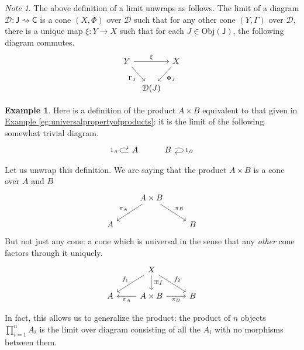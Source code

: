 \documentclass[a4paper]{report}
\newcommand{\Obj}{\mathrm{Obj}}
\theoremstyle{definition}
\newtheorem{example}{Example}[section]
\theoremstyle{plain}
\theoremstyle{remark}
\newtheorem{note}{Note}[section]
\begin{document}
\begin{note}
  The above definition of a limit unwraps as follows. The limit of a diagram $\mathcal{D}\colon \mathsf{J} \rightsquigarrow \mathsf{C}$ is a cone $(X, \Phi)$ over $\mathcal{D}$ such that for any other cone $(Y, \Gamma)$ over $\mathcal{D}$, there is a unique map $\xi\colon Y \to X$ such that for each $J \in \Obj(\mathsf{J})$, the following diagram commutes.
  \begin{equation*}
    \begin{tikzcd}[column sep=tiny]
      Y
      \arrow[rr, "\xi"]
      \arrow[dr, swap, "\Gamma_{J}"]
      & & X
      \arrow[dl, "\Phi_{J}"]
      \\
      & \mathcal{D}(J)
    \end{tikzcd}
  \end{equation*}
\end{note} 

\begin{example}
  Here is a definition of the product $A \times B$ equivalent to that given in \hyperref[eg:universalpropertyofproducts]{Example \ref*{eg:universalpropertyofproducts}}: it is the limit of the following somewhat trivial diagram.
  \begin{equation*}
    \begin{tikzcd}
      A
      \arrow[loop left, "1_{A}"]
      & B
      \arrow[loop right, "1_{B}"]
    \end{tikzcd}
  \end{equation*}

  Let us unwrap this definition. We are saying that the product $A \times B$ is a cone over $A$ and $B$
  \begin{equation*}
    \begin{tikzcd}
      & A \times B
      \arrow[dl, swap, "\pi_{A}"]
      \arrow[dr, "\pi_{B}"]
      \\
      A & & B
    \end{tikzcd}
  \end{equation*}
  But not just any cone: a cone which is universal in the sense that any \emph{other} cone factors through it uniquely.
  \begin{equation*}
    \begin{tikzcd}
      & X
      \arrow[dl, swap, "f_{1}"]
      \arrow[dr, "f_{2}"]
      \arrow[d, "\exists!f"]
      \\
      A 
      & A \times B 
      \arrow[l, "\pi_{A}"]
      \arrow[r, swap, "\pi_{B}"]
      & B
    \end{tikzcd}
  \end{equation*}

  In fact, this allows us to generalize the product: the product of $n$ objects $\prod_{i=1}^{n} A_{i}$ is the limit over diagram consisting of all the $A_{i}$ with no morphisms between them.
\end{example}
\end{document}
